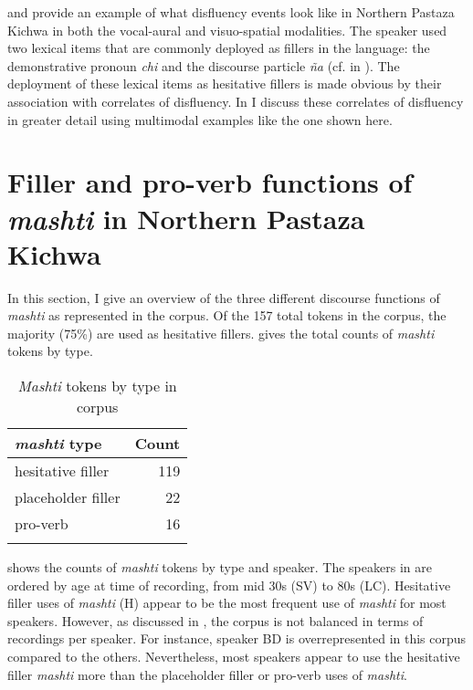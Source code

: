 \documentclass[output=paper]{langscibook}
\begin{document}
 and  provide an example of what disfluency events look like in Northern Pastaza Kichwa in both the vocal-aural and visuo-spatial modalities. The speaker used two lexical items that are commonly deployed as fillers in the language: the demonstrative pronoun \textit{chi} and the discourse particle \textit{ña} (cf.  in ). The deployment of these lexical items as hesitative fillers is made obvious by their association with correlates of disfluency. In  I discuss these correlates of disfluency in greater detail using multimodal examples like the one shown here.

\section{Filler and pro-verb functions of \textit{mashti} in Northern Pastaza Kichwa}
\label{sec:rice:3}

In this section, I give an overview of the three different discourse functions of \textit{mashti} as represented in the corpus. Of the 157 total tokens in the corpus, the majority (75\%) are used as hesitative fillers.  gives the total counts of \textit{mashti} tokens by type.



\begin{table}
\begin{tabular}{lr}
\lsptoprule
\textit{mashti} type & Count\\
\midrule
hesitative filler & 119\\
placeholder filler & 22\\
pro-verb & 16\\
\lspbottomrule
\end{tabular}
\caption{\label{tab:rice:4} \textit{Mashti} tokens by type in corpus}
\end{table}

 shows the counts of \textit{mashti} tokens by type and speaker. The speakers in  are ordered by age at time of recording, from mid 30s (SV) to 80s (LC). Hesitative filler uses of \textit{mashti} (H) appear to be the most frequent use of \textit{mashti} for most speakers. However, as discussed in , the corpus is not balanced in terms of recordings per speaker. For instance, speaker BD is overrepresented in this corpus compared to the others. Nevertheless, most speakers appear to use the hesitative filler \textit{mashti} more than the placeholder filler or pro-verb uses of \textit{mashti}.
\end{document}
